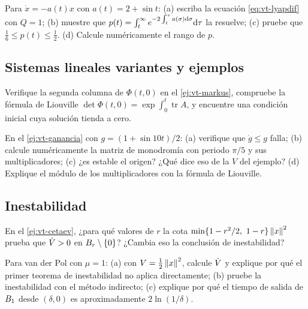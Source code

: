 \begin{problema}\label{prob:vt-lyapdif}
\etiquetaEstrella{} Para $\dot x=-a(t)x$ con $a(t)=2+\sin t$: (a) escriba la ecuación \eqref{eq:vt-lyapdif} con $Q=1$; (b) muestre que $p(t)=\int_t^\infty e^{-2\int_t^\tau a(\sigma)\mathrm{d}\sigma}\mathrm{d}\tau$ la resuelve; (c) pruebe que $\tfrac16\le p(t)\le\tfrac12$. \etiquetaM{} (d) Calcule numéricamente el rango de $p$.
\end{problema}

\subsection*{Sistemas lineales variantes y ejemplos}

\begin{problema}\label{prob:vt-markus}
Verifique la segunda columna de $\Phi(t,0)$ en el \cref{ej:vt-markus}, compruebe la fórmula de Liouville $\det\Phi(t,0)=\exp\int_0^t\operatorname{tr}A$, y encuentre una condición inicial cuya solución tienda a cero.
\end{problema}

\begin{problema}\label{prob:vt-grapida}
\etiquetaM{} En el \cref{ej:vt-ganancia} con $g=(1+\sin10t)/2$: (a) verifique que $\dot g\le g$ falla; (b) calcule numéricamente la matriz de monodromía con periodo $\pi/5$ y sus multiplicadores; (c) ¿es estable el origen? ¿Qué dice eso de la $V$ del ejemplo? (d) Explique el módulo de los multiplicadores con la fórmula de Liouville.
\end{problema}

\subsection*{Inestabilidad}

\begin{problema}\label{prob:vt-cetaevr}
En el \cref{ej:vt-cetaev}, ¿para qué valores de $r$ la cota $\min\{1-r^2/2,\ 1-r\}\left\lVert x\right\rVert^2$ prueba que $\dot V>0$ en $B_{r}\setminus\{0\}$? ¿Cambia eso la conclusión de inestabilidad?
\end{problema}

\begin{problema}\label{prob:vt-vdp}
\etiquetaEstrella{} Para van der Pol con $\mu=1$: (a) con $V=\tfrac12\left\lVert x\right\rVert^2$, calcule $\dot V$ y explique por qué el primer teorema de inestabilidad no aplica directamente; (b) pruebe la inestabilidad con el método indirecto; (c) explique por qué el tiempo de salida de $B_{1}$ desde $(\delta,0)$ es aproximadamente $2\ln(1/\delta)$.
\end{problema}

